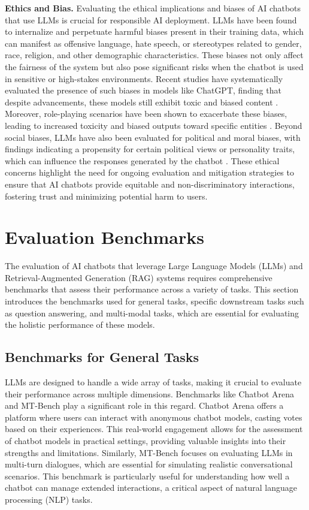 \textbf{Ethics and Bias.} Evaluating the ethical implications and biases of AI chatbots that use LLMs is crucial for responsible AI deployment. LLMs have been found to internalize and perpetuate harmful biases present in their training data, which can manifest as offensive language, hate speech, or stereotypes related to gender, race, religion, and other demographic characteristics. These biases not only affect the fairness of the system but also pose significant risks when the chatbot is used in sensitive or high-stakes environments. Recent studies have systematically evaluated the presence of such biases in models like ChatGPT, finding that despite advancements, these models still exhibit toxic and biased content \cite{zhuo2023systematic}. Moreover, role-playing scenarios have been shown to exacerbate these biases, leading to increased toxicity and biased outputs toward specific entities \cite{deshpande2023bias}. Beyond social biases, LLMs have also been evaluated for political and moral biases, with findings indicating a propensity for certain political views or personality traits, which can influence the responses generated by the chatbot \cite{ferrara2023politicalbias}. These ethical concerns highlight the need for ongoing evaluation and mitigation strategies to ensure that AI chatbots provide equitable and non-discriminatory interactions, fostering trust and minimizing potential harm to users.

\section{Evaluation Benchmarks}

The evaluation of AI chatbots that leverage Large Language Models (LLMs) and Retrieval-Augmented Generation (RAG) systems requires comprehensive benchmarks that assess their performance across a variety of tasks. This section introduces the benchmarks used for general tasks, specific downstream tasks such as question answering, and multi-modal tasks, which are essential for evaluating the holistic performance of these models.

\subsection{Benchmarks for General Tasks}

LLMs are designed to handle a wide array of tasks, making it crucial to evaluate their performance across multiple dimensions. Benchmarks like Chatbot Arena and MT-Bench play a significant role in this regard. Chatbot Arena offers a platform where users can interact with anonymous chatbot models, casting votes based on their experiences. This real-world engagement allows for the assessment of chatbot models in practical settings, providing valuable insights into their strengths and limitations. Similarly, MT-Bench focuses on evaluating LLMs in multi-turn dialogues, which are essential for simulating realistic conversational scenarios. This benchmark is particularly useful for understanding how well a chatbot can manage extended interactions, a critical aspect of natural language processing (NLP) tasks.

